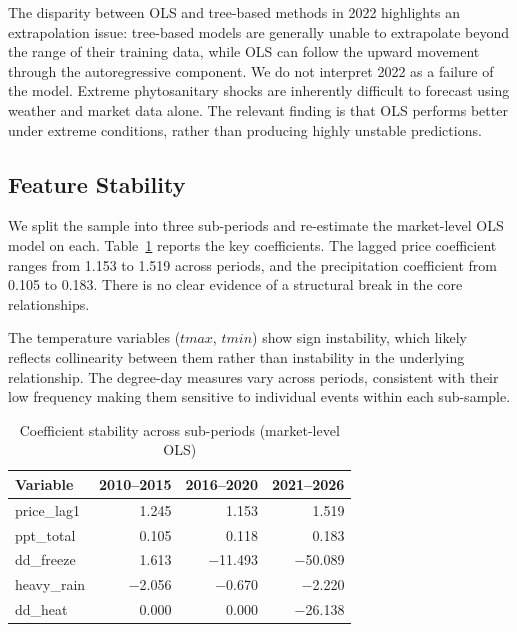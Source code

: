 \documentclass[12pt]{article}
\begin{document}
The disparity between OLS and tree-based methods in 2022 highlights an extrapolation issue: tree-based models are generally unable to extrapolate beyond the range of their training data, while OLS can follow the upward movement through the autoregressive component. We do not interpret 2022 as a failure of the model. Extreme phytosanitary shocks are inherently difficult to forecast using weather and market data alone. The relevant finding is that OLS performs better under extreme conditions, rather than producing highly unstable predictions.

\subsection{Feature Stability}
\label{subsec:stability}

We split the sample into three sub-periods and re-estimate the market-level OLS model on each. Table~\ref{tab:stability} reports the key coefficients. The lagged price coefficient ranges from 1.153 to 1.519 across periods, and the precipitation coefficient from 0.105 to 0.183. There is no clear evidence of a structural break in the core relationships.

The temperature variables ($tmax$, $tmin$) show sign instability, which likely reflects collinearity between them rather than instability in the underlying relationship. The degree-day measures vary across periods, consistent with their low frequency making them sensitive to individual events within each sub-sample.

\begin{table}[!htbp]
\centering
\caption{Coefficient stability across sub-periods (market-level OLS)}
\label{tab:stability}
\begin{tabular}{lrrr}
\toprule
Variable & 2010--2015 & 2016--2020 & 2021--2026 \\
\midrule
price\_lag1 & 1.245 & 1.153 & 1.519 \\
ppt\_total & 0.105 & 0.118 & 0.183 \\
dd\_freeze & 1.613 & $-$11.493 & $-$50.089 \\
heavy\_rain & $-$2.056 & $-$0.670 & $-$2.220 \\
dd\_heat & 0.000 & 0.000 & $-$26.138 \\
\bottomrule
\end{tabular}
\end{table}
\end{document}
